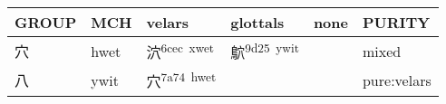 \documentclass[14pt,a4paper]{scrartcl}
\begin{document}
\begin{longtable}[c]{@{}llllll@{}}
\toprule
\begin{minipage}[b]{0.14\columnwidth}\raggedright\strut
GROUP
\strut\end{minipage} &
\begin{minipage}[b]{0.14\columnwidth}\raggedright\strut
MCH
\strut\end{minipage} &
\begin{minipage}[b]{0.14\columnwidth}\raggedright\strut
velars
\strut\end{minipage} &
\begin{minipage}[b]{0.14\columnwidth}\raggedright\strut
glottals
\strut\end{minipage} &
\begin{minipage}[b]{0.14\columnwidth}\raggedright\strut
none
\strut\end{minipage} &
\begin{minipage}[b]{0.14\columnwidth}\raggedright\strut
PURITY
\strut\end{minipage}\tabularnewline
\midrule
\endhead
\begin{minipage}[t]{0.14\columnwidth}\raggedright\strut
穴
\strut\end{minipage} &
\begin{minipage}[t]{0.14\columnwidth}\raggedright\strut
hwet
\strut\end{minipage} &
\begin{minipage}[t]{0.14\columnwidth}\raggedright\strut
泬\textsuperscript{6cec~xwet}
\strut\end{minipage} &
\begin{minipage}[t]{0.14\columnwidth}\raggedright\strut
鴥\textsuperscript{9d25~ywit}
\strut\end{minipage} &
\begin{minipage}[t]{0.14\columnwidth}\raggedright\strut
\strut\end{minipage} &
\begin{minipage}[t]{0.14\columnwidth}\raggedright\strut
mixed
\strut\end{minipage}\tabularnewline
\begin{minipage}[t]{0.14\columnwidth}\raggedright\strut
八
\strut\end{minipage} &
\begin{minipage}[t]{0.14\columnwidth}\raggedright\strut
ywit
\strut\end{minipage} &
\begin{minipage}[t]{0.14\columnwidth}\raggedright\strut
穴\textsuperscript{7a74~hwet}
\strut\end{minipage} &
\begin{minipage}[t]{0.14\columnwidth}\raggedright\strut
\strut\end{minipage} &
\begin{minipage}[t]{0.14\columnwidth}\raggedright\strut
\strut\end{minipage} &
\begin{minipage}[t]{0.14\columnwidth}\raggedright\strut
pure:velars
\strut\end{minipage}\tabularnewline
\bottomrule
\end{longtable}
\end{document}
